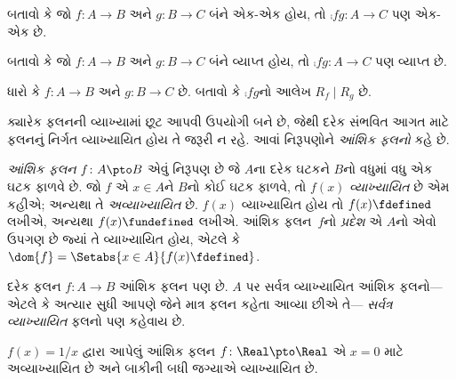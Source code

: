 \begin{prob}
બતાવો કે જો $f \colon A \to B$ અને $g \colon B \to C$
બંને એક-એક હોય, તો $\comp{f}{g}\colon A \to C$
પણ એક-એક છે.
\end{prob}

\begin{prob}
બતાવો કે જો $f \colon A \to B$ અને $g \colon B \to C$
બંને વ્યાપ્ત હોય, તો $\comp{f}{g}\colon A \to C$
પણ વ્યાપ્ત છે.
\end{prob}

\begin{prob}
ધારો કે $f \colon A \to B$ અને $g \colon B \to C$ છે.
બતાવો કે $\comp{f}{g}$નો આલેખ $R_f \mid R_g$ છે.
\end{prob}
\endgroup



\begingroup
\makeatletter{}\makeatother


\label{guunit:OLP-0026}


\begin{explain}
ક્યારેક ફલનની વ્યાખ્યામાં છૂટ આપવી ઉપયોગી બને છે,
જેથી દરેક સંભવિત આગત માટે ફલનનું નિર્ગત વ્યાખ્યાયિત
હોય તે જરૂરી ન રહે. આવાં નિરૂપણોને
\emph{આંશિક ફલનો} કહે છે.
\end{explain}

\begin{defn}
\emph{આંશિક ફલન} $f \colon A \pto B$ એવું નિરૂપણ છે
જે $A$ના દરેક ઘટકને $B$નો વધુમાં વધુ એક
ઘટક ફાળવે છે. જો $f$ એ $x \in A$ને $B$નો
કોઈ ઘટક ફાળવે, તો $f(x)$ \emph{વ્યાખ્યાયિત} છે
એમ કહીએ; અન્યથા તે \emph{અવ્યાખ્યાયિત} છે.
$f(x)$ વ્યાખ્યાયિત હોય તો $f(x) \fdefined$ લખીએ,
અન્યથા $f(x) \fundefined$ લખીએ. આંશિક ફલન~$f$નો
\emph{પ્રદેશ} એ $A$નો એવો ઉપગણ છે જ્યાં તે
વ્યાખ્યાયિત હોય, એટલે કે
$\dom{f} = \Setabs{x \in A}{f(x) \fdefined}$.
\end{defn}

\begin{ex}
દરેક ફલન $f\colon A \to B$ આંશિક ફલન પણ છે.
$A$ પર સર્વત્ર વ્યાખ્યાયિત આંશિક ફલનો---એટલે કે
અત્યાર સુધી આપણે જેને માત્ર ફલન કહેતા આવ્યા છીએ તે---
\emph{સર્વત્ર વ્યાખ્યાયિત} ફલનો પણ કહેવાય છે.
\end{ex}

\begin{ex}
$f(x) = 1/x$ દ્વારા આપેલું આંશિક ફલન
$f \colon \Real \pto \Real$ એ $x = 0$ માટે
અવ્યાખ્યાયિત છે અને બાકીની બધી જગ્યાએ વ્યાખ્યાયિત છે.
\end{ex}

